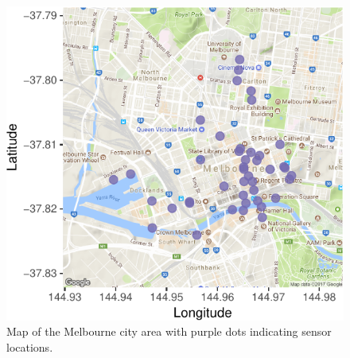 \documentclass[article]{jss}
\theoremstyle{definition}
\theoremstyle{definition}
\theoremstyle{remark}
\begin{document}
\begin{CodeChunk}
\begin{figure}

{\centering \includegraphics[width=0.55\linewidth]{figure/ped-map-1} 

}

\caption[Map of the Melbourne city area with purple dots
indicating sensor locations.]{Map of the Melbourne city area with purple dots
indicating sensor locations.}\label{fig:ped-map}
\end{figure}
\end{CodeChunk}
\end{document}
